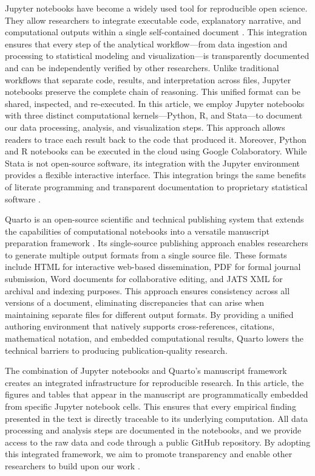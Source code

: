 \documentclass[
  a4paper, 
  twoside,
  review
]{article}
\newcounter{code}
\begin{document}
Jupyter notebooks have become a widely used tool for reproducible open
science. They allow researchers to integrate executable code,
explanatory narrative, and computational outputs within a single
self-contained document \citep{kluyver_jupyter}. This integration
ensures that every step of the analytical workflow---from data ingestion
and processing to statistical modeling and visualization---is
transparently documented and can be independently verified by other
researchers. Unlike traditional workflows that separate code, results,
and interpretation across files, Jupyter notebooks preserve the complete
chain of reasoning. This unified format can be shared, inspected, and
re-executed. In this article, we employ Jupyter notebooks with three
distinct computational kernels---Python, R, and Stata---to document our
data processing, analysis, and visualization steps. This approach allows
readers to trace each result back to the code that produced it.
Moreover, Python and R notebooks can be executed in the cloud using
Google Colaboratory. While Stata is not open-source software, its
integration with the Jupyter environment provides a flexible interactive
interface. This integration brings the same benefits of literate
programming and transparent documentation to proprietary statistical
software \citep{knuth_literate}.

Quarto is an open-source scientific and technical publishing system that
extends the capabilities of computational notebooks into a versatile
manuscript preparation framework \citep{allaire_quarto}. Its
single-source publishing approach enables researchers to generate
multiple output formats from a single source file. These formats include
HTML for interactive web-based dissemination, PDF for formal journal
submission, Word documents for collaborative editing, and JATS XML for
archival and indexing purposes. This approach ensures consistency across
all versions of a document, eliminating discrepancies that can arise
when maintaining separate files for different output formats. By
providing a unified authoring environment that natively supports
cross-references, citations, mathematical notation, and embedded
computational results, Quarto lowers the technical barriers to producing
publication-quality research.

The combination of Jupyter notebooks and Quarto's manuscript framework
creates an integrated infrastructure for reproducible research. In this
article, the figures and tables that appear in the manuscript are
programmatically embedded from specific Jupyter notebook cells. This
ensures that every empirical finding presented in the text is directly
traceable to its underlying computation. All data processing and
analysis steps are documented in the notebooks, and we provide access to
the raw data and code through a public GitHub repository. By adopting
this integrated framework, we aim to promote transparency and enable
other researchers to build upon our work \citep{peng_reproducible}.
\end{document}
